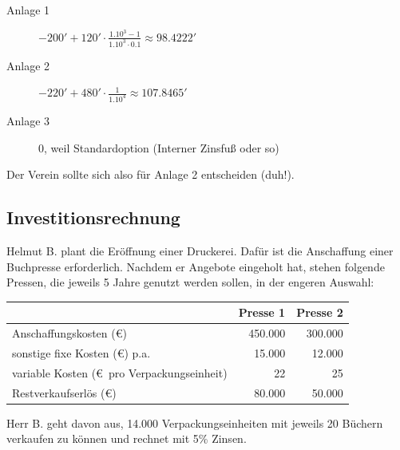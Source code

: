 \documentclass[11pt, a4paper]{article}
\begin{document}
\begin{description}
	\item[Anlage 1] $- 200' + 120' \cdot \frac{1.10^3 - 1}{1.10^3 \cdot 0.1} \approx 98.4222'$
	\item[Anlage 2] $- 220' + 480' \cdot \frac{1}{1.10^4} \approx 107.8465'$
	\item[Anlage 3] 0, weil Standardoption (Interner Zinsfuß oder so)
\end{description}
Der Verein sollte sich also für Anlage 2 entscheiden (duh!).

\subsection{Investitionsrechnung}
Helmut B. plant die Eröffnung einer Druckerei. Dafür ist die Anschaffung einer Buchpresse erforderlich. Nachdem er Angebote eingeholt hat, stehen folgende Pressen, die jeweils 5 Jahre genutzt werden sollen, in der engeren Auswahl:

\vspace{\baselineskip}
\begin{tabular}{l|r|r}
	& Presse 1 & Presse 2 \\ \hline
	Anschaffungskosten (\euro) & 450.000 & 300.000 \\
	sonstige fixe Kosten (\euro) p.a. & 15.000 & 12.000 \\
	variable Kosten (\euro \ pro Verpackungseinheit) & 22 & 25 \\
	Restverkaufserlös (\euro) & 80.000 & 50.000
\end{tabular}

\vspace{\baselineskip}
Herr B. geht davon aus, 14.000 Verpackungseinheiten mit jeweils 20 Büchern verkaufen zu können und rechnet mit 5\% Zinsen.
\end{document}
